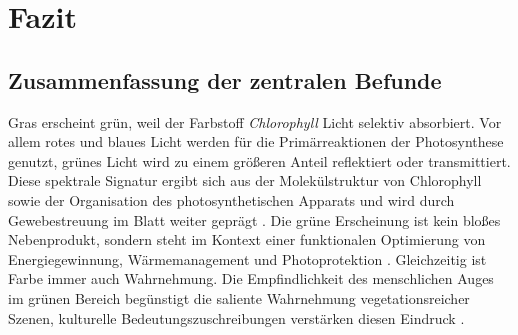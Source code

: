 \chapter{Fazit}

\section{Zusammenfassung der zentralen Befunde}
Gras erscheint grün, weil der Farbstoff \textit{Chlorophyll} Licht selektiv absorbiert. Vor allem rotes und blaues Licht werden für die Primärreaktionen der Photosynthese genutzt, grünes Licht wird zu einem größeren Anteil reflektiert oder transmittiert. Diese spektrale Signatur ergibt sich aus der Molekülstruktur von Chlorophyll sowie der Organisation des photosynthetischen Apparats und wird durch Gewebestreuung im Blatt weiter geprägt \parencite{meyer2018photosynthese, schmidt2015chlorophyll}. Die grüne Erscheinung ist kein bloßes Nebenprodukt, sondern steht im Kontext einer funktionalen Optimierung von Energiegewinnung, Wärmemanagement und Photoprotektion \parencite{gao2010lightabsorption, zhao2012chlorophyll}. Gleichzeitig ist Farbe immer auch Wahrnehmung. Die Empfindlichkeit des menschlichen Auges im grünen Bereich begünstigt die saliente Wahrnehmung vegetationsreicher Szenen, kulturelle Bedeutungszuschreibungen verstärken diesen Eindruck \parencite{renoult2017evolution, weber2016farbpsychologie, fischer2010farbe}.

